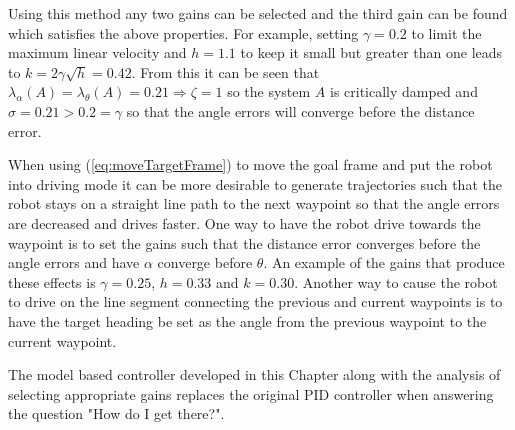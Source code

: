 Using this method any two gains can be selected and the third gain can be found which satisfies the above properties. For example, setting $\gamma=0.2$ to limit the maximum linear velocity and $h=1.1$ to keep it small but greater than one leads to $k=2\gamma\sqrt{h}=0.42$. From this it can be seen that $\lambda_\alpha(A) = \lambda_\theta(A) = 0.21 \Rightarrow \zeta = 1$ so the system $A$ is critically damped and $\sigma = 0.21>0.2=\gamma$ so that the angle errors will converge before the distance error.

When using (\ref{eq:moveTargetFrame}) to move the goal frame and put the robot into driving mode it can be more desirable to generate trajectories such that the robot stays on a straight line path to the next waypoint so that the angle errors are decreased and drives faster. One way to have the robot drive towards the waypoint is to set the gains such that the distance error converges before the angle errors and have $\alpha$ converge before $\theta$. An example of the gains that produce these effects is $\gamma=0.25$, $h=0.33$ and $k=0.30$. Another way to cause the robot to drive on the line segment connecting the previous and current waypoints is to have the target heading be set as the angle from the previous waypoint to the current waypoint.

The model based controller developed in this Chapter along with the analysis of selecting appropriate gains replaces the original PID controller when answering the question "How do I get there?".
